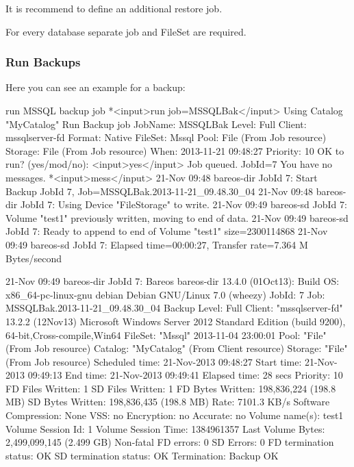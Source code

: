 It is recommend to define an additional restore job. 

For every database separate job and FileSet are required.

\subsubsection{Run Backups}

Here you can see an example for a backup:

\begin{bconsole}{run MSSQL backup job}
*<input>run job=MSSQLBak</input>
Using Catalog "MyCatalog"
Run Backup job
JobName:  MSSQLBak
Level:    Full
Client:   mssqlserver-fd
Format:   Native
FileSet:  Mssql
Pool:     File (From Job resource)
Storage:  File (From Job resource)
When:     2013-11-21 09:48:27
Priority: 10
OK to run? (yes/mod/no): <input>yes</input>
Job queued. JobId=7
You have no messages.
*<input>mess</input>
21-Nov 09:48 bareos-dir JobId 7: Start Backup JobId 7, Job=MSSQLBak.2013-11-21_09.48.30_04
21-Nov 09:48 bareos-dir JobId 7: Using Device "FileStorage" to write.
21-Nov 09:49 bareos-sd JobId 7: Volume "test1" previously written, moving to end of data.
21-Nov 09:49 bareos-sd JobId 7: Ready to append to end of Volume "test1" size=2300114868
21-Nov 09:49 bareos-sd JobId 7: Elapsed time=00:00:27, Transfer rate=7.364 M Bytes/second

21-Nov 09:49 bareos-dir JobId 7: Bareos bareos-dir 13.4.0 (01Oct13):
  Build OS:               x86_64-pc-linux-gnu debian Debian GNU/Linux 7.0 (wheezy)
  JobId:                  7
  Job:                    MSSQLBak.2013-11-21_09.48.30_04
  Backup Level:           Full
  Client:                 "mssqlserver-fd" 13.2.2 (12Nov13) Microsoft Windows Server 2012 Standard Edition (build 9200), 64-bit,Cross-compile,Win64
  FileSet:                "Mssql" 2013-11-04 23:00:01
  Pool:                   "File" (From Job resource)
  Catalog:                "MyCatalog" (From Client resource)
  Storage:                "File" (From Job resource)
  Scheduled time:         21-Nov-2013 09:48:27
  Start time:             21-Nov-2013 09:49:13
  End time:               21-Nov-2013 09:49:41
  Elapsed time:           28 secs
  Priority:               10
  FD Files Written:       1
  SD Files Written:       1
  FD Bytes Written:       198,836,224 (198.8 MB)
  SD Bytes Written:       198,836,435 (198.8 MB)
  Rate:                   7101.3 KB/s
  Software Compression:   None
  VSS:                    no
  Encryption:             no
  Accurate:               no
  Volume name(s):         test1
  Volume Session Id:      1
  Volume Session Time:    1384961357
  Last Volume Bytes:      2,499,099,145 (2.499 GB)
  Non-fatal FD errors:    0
  SD Errors:              0
  FD termination status:  OK
  SD termination status:  OK
  Termination:            Backup OK
\end{bconsole}

